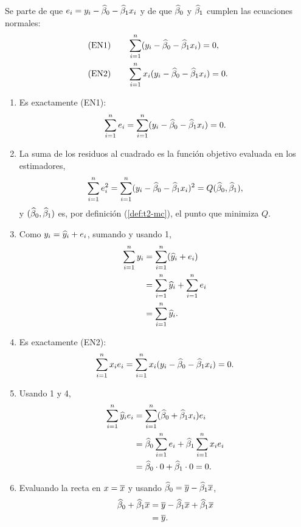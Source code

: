 \begin{demostracion}
  Se parte de que $e_i=y_i-\widehat{\beta}_0-\widehat{\beta}_1x_i$ y de que $\widehat{\beta}_0$ y
  $\widehat{\beta}_1$ cumplen las ecuaciones normales:
  \begin{align*}
    \text{(EN1)}\qquad & \sum_{i=1}^{n} (y_i-\widehat{\beta}_0-\widehat{\beta}_1x_i)=0, \\
    \text{(EN2)}\qquad & \sum_{i=1}^{n} x_i(y_i-\widehat{\beta}_0-\widehat{\beta}_1x_i)=0 .
  \end{align*}
  \begin{enumerate}
    \item Es exactamente (EN1):
      \[
        \sum_{i=1}^{n} e_i = \sum_{i=1}^{n} (y_i-\widehat{\beta}_0-\widehat{\beta}_1x_i) = 0 .
      \]
    \item La suma de los residuos al cuadrado es la función objetivo evaluada en los
      estimadores,
      \[
        \sum_{i=1}^{n} e_i^2 = \sum_{i=1}^{n} (y_i-\widehat{\beta}_0-\widehat{\beta}_1x_i)^2 = Q(\widehat{\beta}_0,\widehat{\beta}_1),
      \]
      y $(\widehat{\beta}_0,\widehat{\beta}_1)$ es, por definición (\cref{def:t2-mc}), el punto que
      minimiza $Q$.
    \item Como $y_i=\widehat{y}_i+e_i$, sumando y usando 1,
      \begin{align*}
        \sum_{i=1}^{n} y_i &= \sum_{i=1}^{n} (\widehat{y}_i+e_i) \\
        &= \sum_{i=1}^{n}\widehat{y}_i+\sum_{i=1}^{n} e_i \\
        &= \sum_{i=1}^{n}\widehat{y}_i .
      \end{align*}
    \item Es exactamente (EN2):
      \[
        \sum_{i=1}^{n} x_ie_i = \sum_{i=1}^{n} x_i(y_i-\widehat{\beta}_0-\widehat{\beta}_1x_i) = 0 .
      \]
    \item Usando 1 y 4,
      \begin{align*}
        \sum_{i=1}^{n} \widehat{y}_ie_i &= \sum_{i=1}^{n}(\widehat{\beta}_0+\widehat{\beta}_1x_i)e_i \\
        &= \widehat{\beta}_0\sum_{i=1}^{n} e_i+\widehat{\beta}_1\sum_{i=1}^{n} x_ie_i \\
        &= \widehat{\beta}_0\cdot0+\widehat{\beta}_1\cdot0 = 0 .
      \end{align*}
    \item Evaluando la recta en $x=\overline{x}$ y usando
      $\widehat{\beta}_0=\overline{y}-\widehat{\beta}_1\overline{x}$,
      \begin{align*}
        \widehat{\beta}_0+\widehat{\beta}_1\overline{x} &= \overline{y}-\widehat{\beta}_1\overline{x}+\widehat{\beta}_1\overline{x} \\
        &= \overline{y} .
      \end{align*}
  \end{enumerate}
\end{demostracion}


